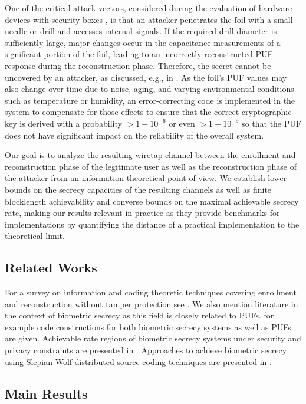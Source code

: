 One of the critical attack vectors, considered during the evaluation of hardware devices with security boxes  \cite{jilHDSB}, is that an attacker penetrates the foil with a small needle or drill and accesses internal signals. If the required drill diameter is sufficiently large, major changes occur in the capacitance measurements  of a significant portion of the foil, leading to an incorrectly reconstructed PUF response during the reconstruction phase. Therefore, the secret cannot be uncovered by an attacker, as discussed, e.g., in \cite{GXKF22}. As the foil's PUF values may also change over time due to noise, aging, and varying environmental conditions such as temperature or humidity, an error-correcting code is implemented in the system to compensate for those effects to ensure that the correct cryptographic key is derived with a probability $> 1-10^{-6}$ or even $>1-10^{-9}$ so that the PUF does not have significant impact on the reliability of the overall system.

Our goal is to analyze the resulting wiretap channel \cite{wyner1975wire,csiszar1978broadcast} between the enrollment and reconstruction phase of the legitimate user as well as the reconstruction phase of the attacker from an information theoretical point of view. We establish lower bounds on the secrecy capacities of the resulting channels as well as finite blocklength achievability and converse bounds on the maximal achievable secrecy rate, making our results relevant in practice as they provide benchmarks for implementations by quantifying the distance of a practical implementation to the theoretical limit.

\subsection{Related Works}
For a survey on information and coding theoretic techniques covering enrollment and reconstruction without tamper protection see \cite{gunlu2020optimality}. We also mention literature in the context of biometric secrecy as this field is closely related to PUFs. \cite{gunlu2019code} for example code constructions for both biometric secrecy systems as well as PUFs are given. Achievable rate regions of biometric secrecy systems under security and privacy constraints are presented in \cite{ignatenko2009biometric}. Approaches to achieve biometric secrecy using Slepian-Wolf distributed source coding techniques are presented in \cite{vetro2009securing,draper2007using}.

\subsection{Main Results}

